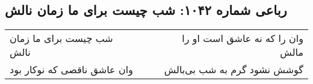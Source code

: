 \begin{center}
\section*{رباعی شماره ۱۰۴۲: شب چیست برای ما زمان نالش}
\label{sec:1042}
\begin{longtable}{l p{0.5cm} r}
شب چیست برای ما زمان نالش
&&
وان را که نه عاشق است او را مالش
\\
وان عاشق ناقصی که نوکار بود
&&
گوشش نشود گرم به شب بی‌بالش
\\
\end{longtable}
\end{center}
